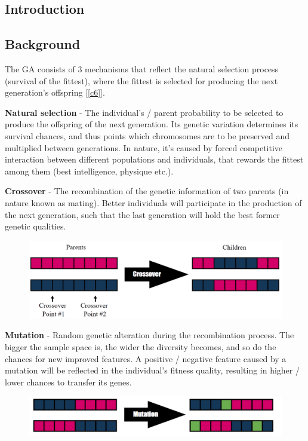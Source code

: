 \documentclass[12pt]{article}
\numberwithin{equation}{section}
\begin{document}
\begin{flushleft}
\section{Introduction} 

\subsection{Background} \label{Background}

The GA consists of 3 mechanisms that reflect the natural selection process (survival of the fittest), where the fittest is selected for producing the next generation's offspring [\ref{c6}].

\textbf{Natural selection} - The individual's / parent probability to be selected to produce the offspring of the next generation. Its genetic variation determines its survival chances, and thus points which chromosomes are to be preserved and multiplied between generations. In nature, it's caused by forced competitive interaction between different populations and individuals, that rewards the fittest among them (best intelligence, physique etc.). 

\textbf{Crossover} - The recombination of the genetic information of two parents (in nature known as mating). Better individuals will participate in the production of the next generation, such that the last generation will hold the best former genetic qualities. 
\begin{figure}[H]
\centering
\includegraphics[scale=0.29]{q_10.png}
\end{figure}
\textbf{Mutation} - Random genetic alteration during the recombination process. The bigger the sample space is, the wider the diversity becomes, and so do the chances for new improved features. A positive / negative feature caused by a mutation will be reflected in the individual's fitness quality, resulting in higher / lower chances to transfer its genes. \newline
\begin{figure}[H]
\centering
\includegraphics[scale=0.375]{q_11.png}
\end{figure}


\end{flushleft}
\end{document}
